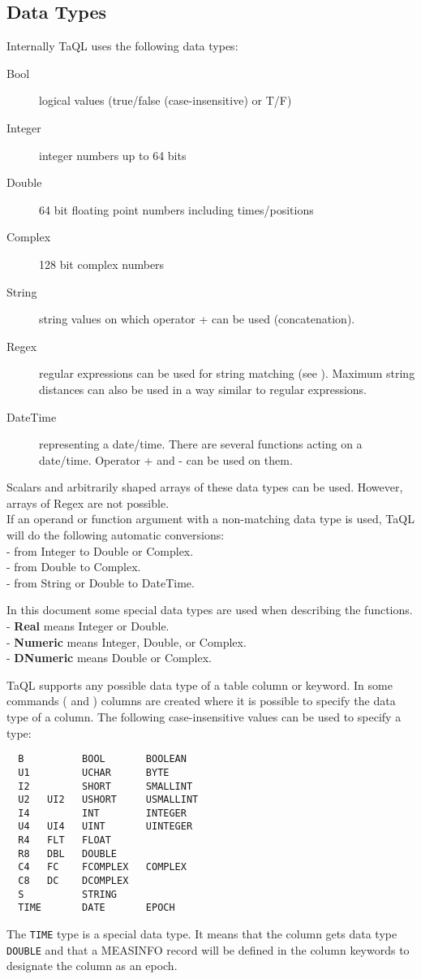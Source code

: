 \subsection{\label{TAQL:DATATYPES}Data Types}
Internally TaQL uses the following data types:
\begin{description}
  \item[Bool ] logical values (true/false (case-insensitive) or T/F)
  \item[Integer ] integer numbers up to 64 bits
  \item[Double ] 64 bit floating point numbers including times/positions
  \item[Complex ] 128 bit complex numbers
  \item[String ] string values on which operator + can be used (concatenation).
  \item[Regex ] regular expressions can be used for string
    matching (see ). Maximum string
    distances can also be used in a way similar to regular
    expressions. 
  \item[DateTime ] representing a date/time. There are several functions
       acting on a date/time. Operator + and - can be used on them.
\end{description}
Scalars and arbitrarily shaped arrays of these data types can be used.
However, arrays of Regex are not possible.
\\If an operand or function argument with a non-matching data type
is used, TaQL will do the following automatic conversions:
\\- from Integer to Double or Complex.
\\- from Double to Complex.
\\- from String or Double to DateTime.

In this document some special data types are used when describing the functions.
\\- \textbf{Real} means Integer or Double.
\\- \textbf{Numeric} means Integer, Double, or Complex.
\\- \textbf{DNumeric} means Double or Complex.

\label{TAQL:DATATYPESTRING}
TaQL supports any possible data type of a table column or keyword.
In some commands ( and
) columns are created where
it is possible to specify the data type of a column. 
The following case-insensitive values can be used to specify a type:
\begin{verbatim}
  B          BOOL       BOOLEAN
  U1         UCHAR      BYTE
  I2         SHORT      SMALLINT
  U2   UI2   USHORT     USMALLINT
  I4         INT        INTEGER
  U4   UI4   UINT       UINTEGER
  R4   FLT   FLOAT
  R8   DBL   DOUBLE
  C4   FC    FCOMPLEX   COMPLEX
  C8   DC    DCOMPLEX
  S          STRING
  TIME       DATE       EPOCH
\end{verbatim}
The \texttt{TIME} type is a special data type. It means that the column
gets data type \texttt{DOUBLE} and that a MEASINFO record will be
defined in the column keywords to designate the column as an epoch.

